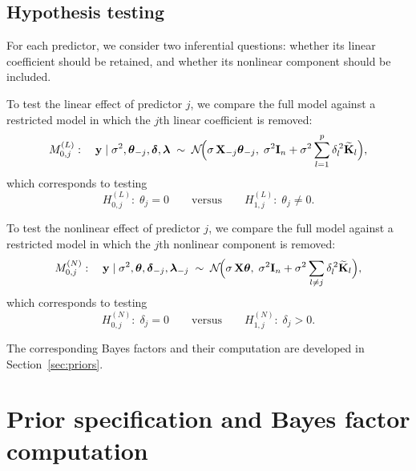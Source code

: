 \documentclass{article}
\begin{document}
\subsection{Hypothesis testing\label{subsec:testing}}

For each predictor, we consider two inferential questions: whether its linear coefficient should be retained, and whether its nonlinear component should be included.

To test the linear effect of predictor $j$, we compare the full model
against a restricted model in which the $j$th linear coefficient is
removed:
%
\begin{equation}
\label{eq:model-minus-theta-j}
M_{0,j}^{(L)}:\quad
\mathbf{y}\mid\sigma^2,\boldsymbol{\theta}_{-j},
\boldsymbol{\delta},\boldsymbol{\lambda}
\;\sim\;
\mathcal{N}\!\Bigl(
  \sigma\,\mathbf{X}_{-j}\boldsymbol{\theta}_{-j},\;
  \sigma^2\mathbf{I}_n
  + \sigma^2\sum_{l=1}^{p}\delta_l^{\,2}\widetilde{\mathbf{K}}_l
\Bigr),
\end{equation}
%
which corresponds to testing
%
\begin{equation}
\label{eq:test-linear}
H_{0,j}^{(L)}:\;\theta_j = 0
\qquad\text{versus}\qquad
H_{1,j}^{(L)}:\;\theta_j \neq 0.
\end{equation}

To test the nonlinear effect of predictor $j$, we compare the full
model against a restricted model in which the $j$th nonlinear
component is removed:
%
\begin{equation}
\label{eq:model-minus-delta-j}
M_{0,j}^{(N)}:\quad
\mathbf{y}\mid\sigma^2,\boldsymbol{\theta},
\boldsymbol{\delta}_{-j},\boldsymbol{\lambda}_{-j}
\;\sim\;
\mathcal{N}\!\Bigl(
  \sigma\,\mathbf{X}\boldsymbol{\theta},\;
  \sigma^2\mathbf{I}_n
  + \sigma^2\sum_{l\neq j}\delta_l^{\,2}\widetilde{\mathbf{K}}_l
\Bigr),
\end{equation}
%
which corresponds to testing
%
\begin{equation}
\label{eq:test-nonlinear}
H_{0,j}^{(N)}:\;\delta_j = 0
\qquad\text{versus}\qquad
H_{1,j}^{(N)}:\;\delta_j > 0.
\end{equation}

The corresponding Bayes factors and their computation are developed
in Section~\ref{sec:priors}.


\section{Prior specification and Bayes factor
  computation\label{sec:priors}}
\end{document}
